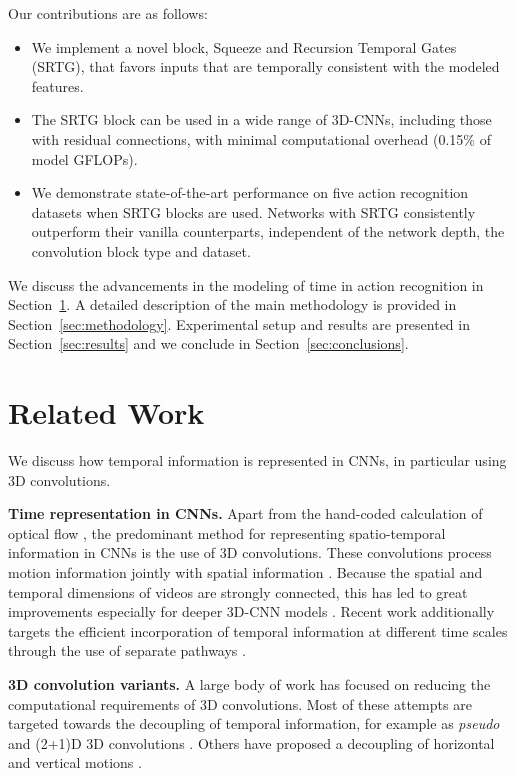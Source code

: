 \documentclass[final,5p,times,twocolumn]{elsarticle}
\begin{document}
Our contributions are as follows:
\vspace{-1mm}
\begin{itemize}
    \item We implement a novel block, Squeeze and Recursion Temporal Gates (SRTG), that favors inputs that are temporally consistent with the modeled features.
    
    \item The SRTG block can be used in a wide range of 3D-CNNs, including those with residual connections, with minimal computational overhead (0.15\% of model GFLOPs).

    \item We demonstrate state-of-the-art performance on five action recognition datasets when SRTG blocks are used. Networks with SRTG consistently outperform their vanilla counterparts, independent of the network depth, the convolution block type and dataset.
    
\end{itemize}

We discuss the advancements in the modeling of time in action recognition in Section~\ref{sec:related}. A detailed description of the main methodology is provided in Section~\ref{sec:methodology}. Experimental setup and results are presented in Section~\ref{sec:results} and we conclude in Section~\ref{sec:conclusions}.



\section{Related Work}
\label{sec:related}
We discuss how temporal information is represented in CNNs, in particular using 3D convolutions.

\textbf{Time representation in CNNs.} Apart from the hand-coded calculation of optical flow \citep{simonyan2014two}, the predominant method for representing spatio-temporal information in CNNs is the use of 3D convolutions. These convolutions process motion information jointly with spatial information \citep{ji20133d}. Because the spatial and temporal dimensions of videos are strongly connected, this has led to great improvements especially for deeper 3D-CNN models \citep{carreira2017quo,hara2018can}. Recent work additionally targets the efficient incorporation of temporal information at different time scales through the use of separate pathways \citep{chen2018multifiber,feichtenhofer2019slowfast}.

\textbf{3D convolution variants.} A large body of work has focused on reducing the computational requirements of 3D convolutions. Most of these attempts are targeted towards the decoupling of temporal information, for example as \textit{pseudo} and (2+1)D 3D convolutions \citep{qiu2017learning,tran2018closer}. Others have proposed a decoupling of horizontal and vertical motions \citep{stergiou2019FAST}.
\end{document}
